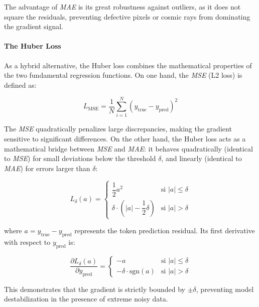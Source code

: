 The advantage of \textit{\gls{MAE}} is its great robustness against outliers, as it does not square the residuals, preventing defective pixels or cosmic rays from dominating the gradient signal.

\paragraph{The Huber Loss}

As a hybrid alternative, the Huber loss combines the mathematical properties of the two fundamental regression functions. On one hand, the \textit{\gls{MSE}} (L2 loss) is defined as:

\begin{equation}
L_{\text{MSE}} = \dfrac{1}{N} \sum_{i=1}^{N} \left(y_{\text{true}} - y_{\text{pred}}\right)^2
\label{eq:mse_loss}
\end{equation}

The \textit{\gls{MSE}} quadratically penalizes large discrepancies, making the gradient sensitive to significant differences. On the other hand, the Huber loss acts as a mathematical bridge between \textit{\gls{MSE}} and \textit{\gls{MAE}}: it behaves quadratically (identical to \textit{\gls{MSE}}) for small deviations below the threshold $\delta$, and linearly (identical to \textit{\gls{MAE}}) for errors larger than $\delta$:

\begin{equation}
L_{\delta}\left(a\right) = \begin{cases}
\dfrac{1}{2}a^2 & \text{si } |a| \le \delta \\
\delta \cdot \left(|a| - \dfrac{1}{2}\delta\right) & \text{si } |a| > \delta
\end{cases}
\label{eq:huber_loss}
\end{equation}

where $a = y_{\text{true}} - y_{\text{pred}}$ represents the token prediction residual. Its first derivative with respect to $y_{\text{pred}}$ is:

\begin{equation}
\dfrac{\partial L_{\delta}\left(a\right)}{\partial y_{\text{pred}}} = \begin{cases}
-a & \text{si } |a| \le \delta \\
-\delta \cdot \text{sgn}\left(a\right) & \text{si } |a| > \delta
\end{cases}
\label{eq:huber_derivative}
\end{equation}

This demonstrates that the gradient is strictly bounded by $\pm\delta$, preventing model destabilization in the presence of extreme noisy data.

